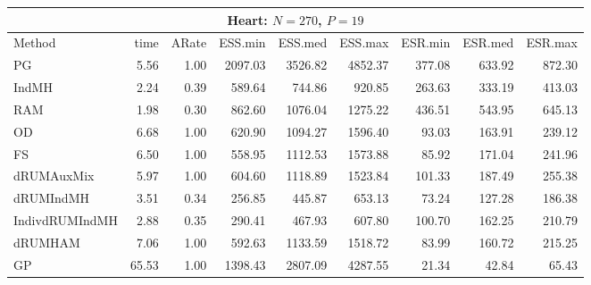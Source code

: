 \begin{table}
\begin{tabular}{l r r r r r r r r } 
\hline
\multicolumn{9}{c}{Heart: $N = 270$, $P=19$} \\
\hline
          Method  &     time &    ARate &  ESS.min &  ESS.med &  ESS.max &  ESR.min &  ESR.med &  ESR.max \\ 
              PG  &     5.56 &     1.00 &  2097.03 &  3526.82 &  4852.37 &   377.08 &   633.92 &   872.30 \\ 
           IndMH  &     2.24 &     0.39 &   589.64 &   744.86 &   920.85 &   263.63 &   333.19 &   413.03 \\ 
             RAM  &     1.98 &     0.30 &   862.60 &  1076.04 &  1275.22 &   436.51 &   543.95 &   645.13 \\ 
              OD  &     6.68 &     1.00 &   620.90 &  1094.27 &  1596.40 &    93.03 &   163.91 &   239.12 \\ 
              FS  &     6.50 &     1.00 &   558.95 &  1112.53 &  1573.88 &    85.92 &   171.04 &   241.96 \\ 
      dRUMAuxMix  &     5.97 &     1.00 &   604.60 &  1118.89 &  1523.84 &   101.33 &   187.49 &   255.38 \\ 
       dRUMIndMH  &     3.51 &     0.34 &   256.85 &   445.87 &   653.13 &    73.24 &   127.28 &   186.38 \\ 
  IndivdRUMIndMH  &     2.88 &     0.35 &   290.41 &   467.93 &   607.80 &   100.70 &   162.25 &   210.79 \\ 
         dRUMHAM  &     7.06 &     1.00 &   592.63 &  1133.59 &  1518.72 &    83.99 &   160.72 &   215.25 \\ 
              GP  &    65.53 &     1.00 &  1398.43 &  2807.09 &  4287.55 &    21.34 &    42.84 &    65.43
 \end{tabular}
\end{table}

